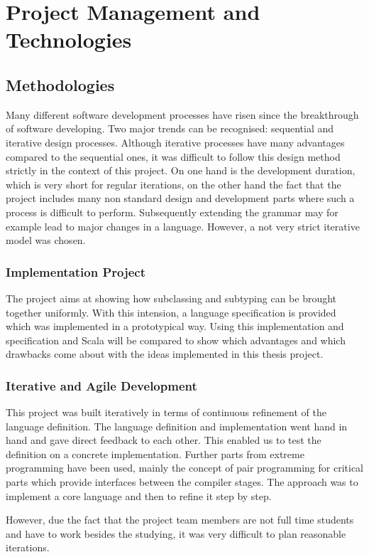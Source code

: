 \chapter{Project Management and Technologies}
\label{ctr:projectManagement}
\section{Methodologies}
Many different software development processes have risen since the
breakthrough of software developing. Two major trends can be recognised:
sequential and iterative design processes. Although iterative processes
have many advantages compared to the sequential ones, it was difficult to follow
this design method strictly in the context of this project. On one hand is the
development duration, which is very short for regular iterations, on the
other hand the fact that the project includes many non standard design and development
parts where such a process is difficult to perform. Subsequently extending the 
grammar may for example lead to major changes in a language. However,
a not very strict iterative model was chosen.

\subsection{Implementation Project}
The project aims at showing how subclassing and subtyping can be brought
together uniformly. With this intension, a language specification is provided which
was implemented in a prototypical way. Using this implementation and
specification \ooplss and Scala will be compared to
show which advantages and which drawbacks come about with the ideas implemented
in this thesis project.

\subsection{Iterative and Agile Development}
This project was built iteratively in terms of continuous refinement
of the language definition. The language definition and implementation
went hand in hand and gave direct feedback to each other. This enabled us
to test the definition on a concrete implementation. Further parts from
extreme programming have been used, mainly the concept of pair programming
for critical parts which provide interfaces between the compiler
stages.
The approach was to implement a core language and then to refine it step
by step.

However, due the fact that the project team members are not full time
students and have to work besides the studying, it was very difficult
to plan reasonable iterations.

